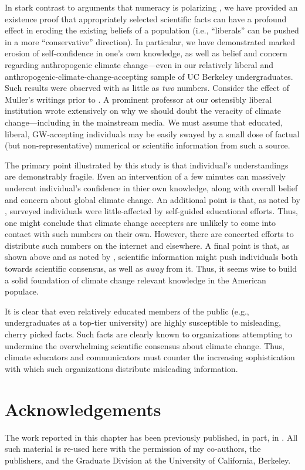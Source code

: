 In stark contrast to arguments that numeracy is polarizing
\parencite{kahan_polarizing_2012}, we have provided an existence proof that
appropriately selected scientific facts can have a profound effect in eroding
the existing beliefs of a population (i.e., “liberals” can be pushed in a more
“conservative” direction). In particular, we have demonstrated marked erosion of
self-confidence in one's own knowledge, as well as belief and concern regarding
anthropogenic climate change---even in our relatively liberal and
anthropogenic-climate-change-accepting sample of UC Berkeley undergraduates.
Such results were observed with as little as \emph{two} numbers.
Consider the effect of Muller's writings prior to \textcite{rohde_new_2013}. A
prominent professor at our ostensibly liberal institution wrote extensively on
why we should doubt the veracity of climate change---including in the mainstream
media. We must assume that educated, liberal, GW-accepting individuals may be
easily swayed by a small dose of factual (but non-representative) numerical or
scientific information from such a source.

The primary point illustrated by this study is that individual's understandings
are demonstrably fragile. Even an intervention of a few minutes can massively
undercut individual's confidence in thier own knowledge, along with overall
belief and concern about global climate change. An additional point is that, as
noted by \textcite{kahan_polarizing_2012,mccright_politicization_2011}, surveyed
individuals were little-affected by self-guided educational efforts. Thus, one
might conclude that climate change accepters are unlikely to come into contact
with such numbers on their own.  However, there are concerted efforts to
distribute such numbers on the internet and elsewhere. A final point is that, as
shown above and as noted by \textcite{mccright_politicization_2011}, scientific
information might push individuals both towards scientific consensus, as well as
\emph{away} from it.  Thus, it seems wise to build a solid foundation of climate
change relevant knowledge in the American populace. 

It is clear that even relatively educated members of the public (e.g.,
undergraduates at a top-tier university) are highly susceptible to misleading,
cherry picked facts. Such facts are clearly known to organizations attempting to
undermine the overwhelming scientific consensus about climate change. Thus,
climate educators and communicators must counter the increasing sophistication
with which such organizations distribute misleading information.

\section*{Acknowledgements}

The work reported in this chapter has been previously published, in part, in
\textcite{clark_knowledge_inpress}.  All such material is re-used here with the
permission of my co-authors, the publishers, and the Graduate Division at the
University of California, Berkeley.
